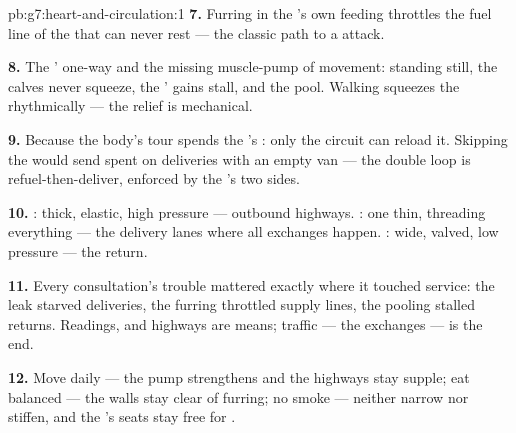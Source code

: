 \begin{solution}{pb:g7:heart-and-circulation:1}
\textbf{7.} Furring in the 's own feeding
 throttles the fuel line of the  that
can never rest --- the classic path to a  attack.

\textbf{8.} The ' one-way  and the missing
muscle-pump of movement: standing still, the calves
never squeeze, the ' gains stall, and the 
pool. Walking squeezes the  rhythmically --- the
relief is mechanical.

\textbf{9.} Because the body's tour spends the 's
: only the  circuit can reload it. Skipping
the  would send spent  on deliveries with an
empty van --- the double loop is refuel-then-deliver,
enforced by the 's two sides.

\textbf{10.} : thick, elastic, high pressure ---
outbound highways. : one  thin, threading
everything --- the delivery lanes where all exchanges
happen. : wide, valved, low pressure --- the
return.

\textbf{11.} Every consultation's trouble mattered
exactly where it touched  service: the leak
starved deliveries, the furring throttled supply
lines, the pooling stalled returns. Readings, 
and highways are means;  traffic --- the
exchanges --- is the end.

\textbf{12.} Move daily --- the pump strengthens and
the highways stay supple; eat balanced --- the 
walls stay clear of furring; no smoke --- 
neither narrow nor stiffen, and the 's seats stay
free for .
\end{solution}
